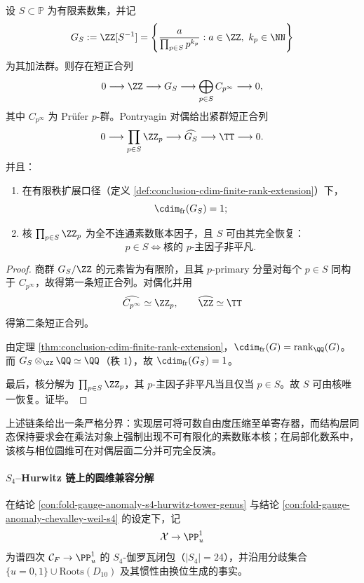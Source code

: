 \begin{theorem}\label{thm:killo-localization-circle-dimension-prime-ledger-splitting}
设 \(S\subset\mathbb P\) 为有限素数集，并记
\[
G_S:=\ZZ[S^{-1}]
=\left\{\frac{a}{\prod_{p\in S}p^{k_p}}:a\in\ZZ,\ k_p\in\NN\right\}
\]
为其加法群。则存在短正合列
\[
0\longrightarrow \ZZ\longrightarrow G_S\longrightarrow \bigoplus_{p\in S}C_{p^\infty}\longrightarrow 0,
\]
其中 \(C_{p^\infty}\) 为 Prüfer \(p\)-群。Pontryagin 对偶给出紧群短正合列
\[
0\longrightarrow \prod_{p\in S}\ZZ_p\longrightarrow \widehat{G_S}\longrightarrow \TT\longrightarrow 0.
\]
并且：
\begin{enumerate}
  \item 在有限秩扩展口径（定义 \ref{def:conclusion-cdim-finite-rank-extension}）下，
  \[
  \cdim_{\mathrm{fr}}(G_S)=1;
  \]
  \item 核 \(\prod_{p\in S}\ZZ_p\) 为全不连通素数账本因子，且 \(S\) 可由其完全恢复：
  \[
  p\in S\iff \text{核的 \(p\)-主因子非平凡}.
  \]
\end{enumerate}
\end{theorem}
\begin{proof}
商群 \(G_S/\ZZ\) 的元素皆为有限阶，且其 \(p\)-primary 分量对每个 \(p\in S\) 同构于 \(C_{p^\infty}\)，故得第一条短正合列。对偶化并用
\[
\widehat{C_{p^\infty}}\simeq \ZZ_p,\qquad \widehat{\ZZ}\simeq \TT
\]
得第二条短正合列。

由定理 \ref{thm:conclusion-cdim-finite-rank-extension}，\(\cdim_{\mathrm{fr}}(G)=\operatorname{rank}_{\QQ}(G)\)。而 \(G_S\otimes_{\ZZ}\QQ\simeq \QQ\)（秩 \(1\)），故 \(\cdim_{\mathrm{fr}}(G_S)=1\)。

最后，核分解为 \(\prod_{p\in S}\ZZ_p\)，其 \(p\)-主因子非平凡当且仅当 \(p\in S\)。故 \(S\) 可由核唯一恢复。证毕。
\end{proof}

上述链条给出一条严格分界：实现层可将可数自由度压缩至单寄存器，而结构层同态保持要求会在乘法对象上强制出现不可有限化的素数账本核；在局部化数系中，该核与相位圆维可在对偶层面二分并可完全反演。

\paragraph{\texorpdfstring{$S_4$}{S4}--Hurwitz 链上的圆维兼容分解}
在结论 \ref{con:fold-gauge-anomaly-s4-hurwitz-tower-genus} 与结论 \ref{con:fold-gauge-anomaly-chevalley-weil-s4} 的设定下，记
\[
\mathcal X\to \PP^1_u
\]
为谱四次 \(\mathcal C_F\to \PP^1_u\) 的 \(S_4\)-伽罗瓦闭包（\(|S_4|=24\)），并沿用分歧集合
\(
\{u=0,1\}\cup\mathrm{Roots}(D_{10})
\)
及其惯性由换位生成的事实。

